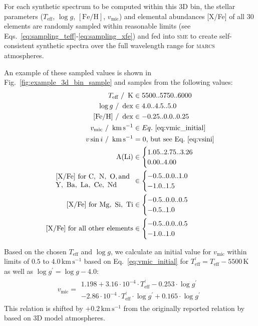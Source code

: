 \documentclass[
  journal=pasa,
  manuscript=research-paper, %
  year=2023,
  volume=37
]{cup-journal}
\newcommand{\Teff}{$T_\mathrm{eff}$\xspace}
\newcommand{\logg}{$\log g$\xspace}
\newcommand{\feh}{$\mathrm{[Fe/H]}$\xspace}
\newcommand{\vmic}{$v_\mathrm{mic}$\xspace}
\newcommand{\sme}{\textsc{sme}\xspace}
\newcommand{\marcs}{\textsc{marcs}\xspace}
\newcommand{\dex}{\,\mathrm{dex}}	%
\newcommand{\K}{\,\mathrm{K}}	%
\newcommand{\kms}{\,\mathrm{km\,s^{-1}}}	%
\begin{document}
For each synthetic spectrum to be computed within this 3D bin, the stellar parameters (\Teff, \logg, \feh, \vmic) and elemental abundances [X/Fe] of all 30 elements are randomly sampled within reasonable limits (see Eqs.~\ref{eq:sampling_teff}-\ref{eq:sampling_xfe}) and fed into \sme to create self-consistent synthetic spectra over the full wavelength range for \marcs atmospheres. 

An example of these sampled values is shown in Fig.~\ref{fig:example_3d_bin_sample} and samples from the following values:
\begin{align} 
    T_\text{eff}~/~\K &\in {5500..5750..6000} \\ \label{eq:sampling_teff}
    \log g~/~\dex &\in {4.0..4.5..5.0} \\
    \mathrm{[Fe/H]}~/~\dex &\in {-0.25..0.0..0.25} \\
    v_\text{mic}~/~\kms &\in Eq.~\ref{eq:vmic_initial} \\
    v \sin i~/~\kms &= 0\text{, but see Eq.~\ref{eq:vsini}} \\
    \mathrm{A(Li)} &\in \begin{cases} {1.05..2.75..3.26} \\ {0.00..4.00} \end{cases} \\
    \begin{array}{l}
    \mathrm{[X/Fe]~for~C,~N,~O, and}\\
    \mathrm{Y,~Ba,~La,~Ce,~Nd}
    \end{array}
    &\in \begin{cases} {-0.5..0.0..1.0} \\ {-1.0..1.5}  \end{cases} \\
    \mathrm{[X/Fe]~for~Mg,~Si,~Ti} &\in \begin{cases} {-0.5..0.0..0.5} \\ {-0.5..1.0}  \end{cases} \\
    \mathrm{[X/Fe]~for~all~other~elements} &\in \begin{cases} {-0.5..0.0..0.5} \\ {-1.0..1.0} \label{eq:sampling_xfe} \end{cases}
\end{align}

Based on the chosen \Teff and \logg, we calculate an initial value for \vmic within limits of $0.5$ to $4.0\kms$ based on Eq.~\ref{eq:vmic_initial} for $T_\text{eff}^\prime = T_\text{eff} - 5500\,\mathrm{K}$ as well as $\log g^\prime = \log g - 4.0$:
\begin{align} 
v_\text{mic} = \begin{array}{l}
1.198 + 3.16 \cdot 10^{-4} \cdot T_\text{eff}^\prime - 0.253 \cdot \log g^\prime \\ - 2.86\cdot 10^{-4} \cdot T_\text{eff}^\prime \cdot \log g^\prime + 0.165 \cdot \log g^\prime
\end{array} \label{eq:vmic_initial}
\end{align}
This relation is shifted by $+0.2\kms$ from the originally reported relation by \citet{DutraFerreira2016} based on 3D model atmospheres.
\end{document}

